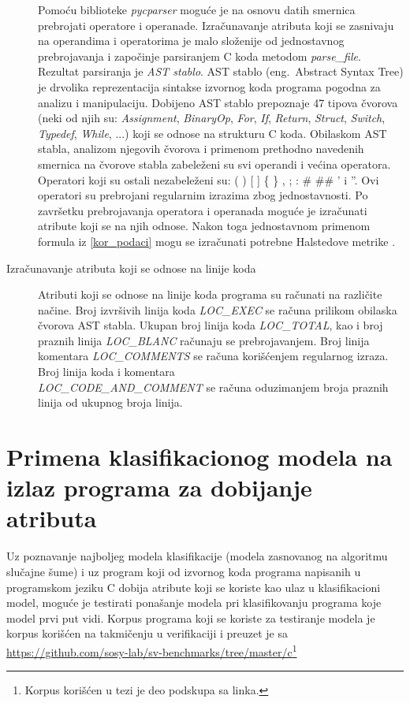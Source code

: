 \documentclass[12pt,oneside]{memoir}
\begin{document}
\begin{description}
Pomoću biblioteke \textit{pycparser} moguće je na osnovu datih smernica prebrojati operatore i operanade. Izračunavanje atributa koji se zasnivaju na operandima i operatorima je malo složenije od jednostavnog prebrojavanja i započinje parsiranjem C koda metodom \textit{parse\_file}. Rezultat parsiranja je \textit{AST stablo}. AST stablo (eng.~Abstract Syntax Tree) je drvolika reprezentacija sintakse izvornog koda programa pogodna za analizu i manipulaciju. Dobijeno AST stablo prepoznaje 47 tipova čvorova (neki od njih su: \textit{Assignment}, \textit{BinaryOp}, \textit{For}, \textit{If}, \textit{Return}, \textit{Struct}, \textit{Switch}, \textit{Typedef}, \textit{While}, ...) koji se odnose na strukturu C koda. Obilaskom AST stabla, analizom njegovih čvorova i primenom prethodno navedenih smernica na čvorove stabla zabeleženi su svi operandi i većina operatora. Operatori koji su ostali nezabeleženi su: ( ) [ ] \{ \} , ; : \# \#\# ' i ''. Ovi operatori su prebrojani regularnim izrazima zbog jednostavnosti. Po završetku prebrojavanja operatora i operanada moguće je izračunati atribute koji se na njih odnose. Nakon toga jednostavnom primenom formula iz \ref{kor_podaci} mogu se izračunati potrebne Halstedove metrike \cite{pycparser}.

\item[Izračunavanje atributa koji se odnose na linije koda]

Atributi koji se odnose na linije koda programa su računati na različite načine. Broj izvršivih linija koda \textit{LOC\_EXEC} se računa prilikom obilaska čvorova AST stabla. Ukupan broj linija koda \textit{LOC\_TOTAL}, kao i broj praznih linija \textit{LOC\_BLANC} računaju se prebrojavanjem. Broj linija komentara \textit{LOC\_COMMENTS} se računa korišćenjem regularnog izraza. Broj linija koda i komentara \\\textit{LOC\_CODE\_AND\_COMMENT} se računa oduzimanjem broja praznih linija od ukupnog broja linija. 

\end{description}

\section{Primena klasifikacionog modela na izlaz programa za dobijanje atributa}

Uz poznavanje najboljeg modela klasifikacije (modela zasnovanog na algoritmu slučajne šume) i uz program koji od izvornog koda programa napisanih u programskom jeziku C dobija atribute koji se koriste kao ulaz u klasifikacioni model, moguće je testirati ponašanje modela pri klasifikovanju programa koje model prvi put vidi. Korpus programa koji se koriste za testiranje modela je korpus korišćen na takmičenju u verifikaciji i preuzet je sa \url{https://github.com/sosy-lab/sv-benchmarks/tree/master/c}\footnote{Korpus korišćen u tezi je deo podskupa sa linka.}
\end{document}
